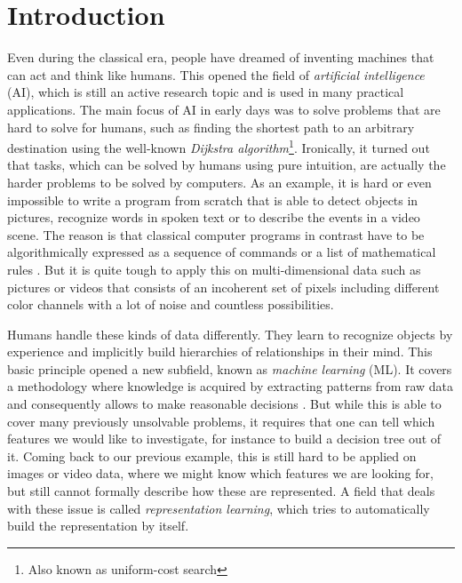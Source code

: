

\chapter{Introduction} \label{chapter:introduction}

Even during the classical era, people have dreamed of inventing machines that can act and think like humans. This opened the field of \textit{artificial intelligence} (AI), which is still an active research topic and is used in many practical applications. The main focus of AI in early days was to solve problems that are hard to solve for humans, such as finding the shortest path to an arbitrary destination using the well-known \textit{Dijkstra algorithm}\footnote{Also known as uniform-cost search}. Ironically, it turned out that tasks, which can be solved by humans using pure intuition, are actually the harder problems to be solved by computers. As an example, it is hard or even impossible to write a program from scratch that is able to detect objects in pictures, recognize words in spoken text or to describe the events in a video scene. The reason is that classical computer programs in contrast have to be algorithmically expressed as a sequence of commands or a list of mathematical rules \parencite{deep_learning}. But it is quite tough to apply this on multi-dimensional data such as pictures or videos that consists of an incoherent set of pixels including different color channels with a lot of noise and countless possibilities. 

Humans handle these kinds of data differently. They learn to recognize objects by experience and implicitly build hierarchies of relationships in their mind. This basic principle opened a new subfield, known as \textit{machine learning} (ML). It covers a methodology where knowledge is acquired by extracting patterns from raw data and consequently allows to make reasonable decisions \parencite{deep_learning}. But while this is able to cover many previously unsolvable problems, it requires that one can tell which features we would like to investigate, for instance to build a decision tree out of it. Coming back to our previous example, this is still hard to be applied on images or video data, where we might know which features we are looking for, but still cannot formally describe how these are represented. A field that deals with these issue is called \textit{representation learning}, which tries to automatically build the representation by itself.

